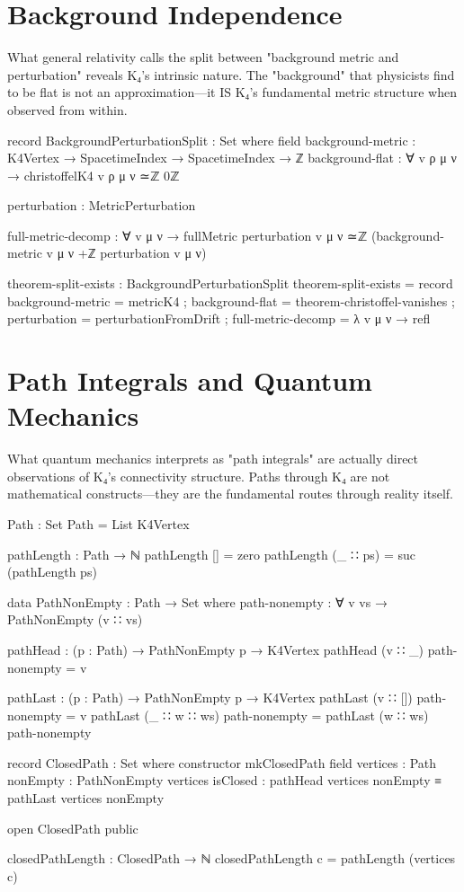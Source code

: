 \documentclass[11pt,a4paper]{book}
\begin{document}
\section{Background Independence}

What general relativity calls the split between "background metric and perturbation" reveals K₄'s intrinsic nature. The "background" that physicists find to be flat is not an approximation—it IS K₄'s fundamental metric structure when observed from within.

\begin{code}
record BackgroundPerturbationSplit : Set where
  field
    background-metric  : K4Vertex → SpacetimeIndex → SpacetimeIndex → ℤ
    background-flat    : ∀ v ρ μ ν → christoffelK4 v ρ μ ν ≃ℤ 0ℤ
    
    perturbation       : MetricPerturbation
    
    full-metric-decomp : ∀ v μ ν → 
      fullMetric perturbation v μ ν ≃ℤ (background-metric v μ ν +ℤ perturbation v μ ν)

theorem-split-exists : BackgroundPerturbationSplit
theorem-split-exists = record
  { background-metric  = metricK4
  ; background-flat    = theorem-christoffel-vanishes
  ; perturbation       = perturbationFromDrift
  ; full-metric-decomp = λ v μ ν → refl
  }
\end{code}

\section{Path Integrals and Quantum Mechanics}

What quantum mechanics interprets as "path integrals" are actually direct observations of K₄'s connectivity structure. Paths through K₄ are not mathematical constructs—they are the fundamental routes through reality itself.

\begin{code}
Path : Set
Path = List K4Vertex

pathLength : Path → ℕ
pathLength [] = zero
pathLength (_ ∷ ps) = suc (pathLength ps)

data PathNonEmpty : Path → Set where
  path-nonempty : ∀ {v vs} → PathNonEmpty (v ∷ vs)

pathHead : (p : Path) → PathNonEmpty p → K4Vertex
pathHead (v ∷ _) path-nonempty = v

pathLast : (p : Path) → PathNonEmpty p → K4Vertex
pathLast (v ∷ []) path-nonempty = v
pathLast (_ ∷ w ∷ ws) path-nonempty = pathLast (w ∷ ws) path-nonempty

record ClosedPath : Set where
  constructor mkClosedPath
  field
    vertices  : Path
    nonEmpty  : PathNonEmpty vertices
    isClosed  : pathHead vertices nonEmpty ≡ pathLast vertices nonEmpty

open ClosedPath public

closedPathLength : ClosedPath → ℕ
closedPathLength c = pathLength (vertices c)
\end{code}
\end{document}
